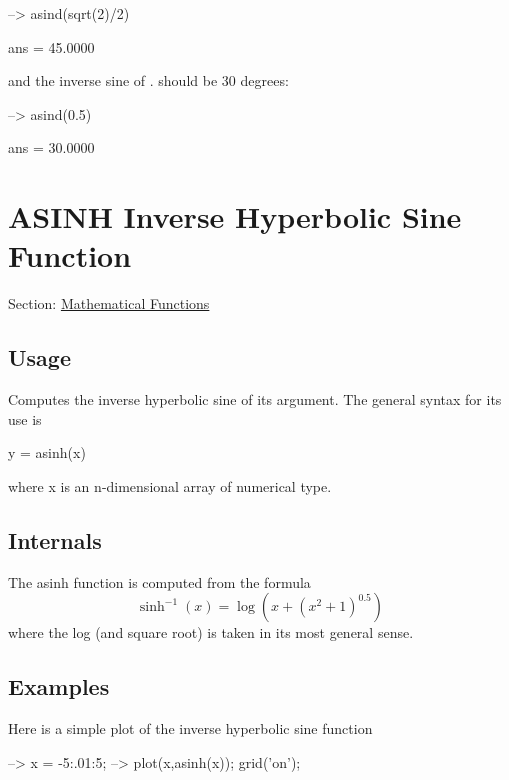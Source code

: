 \begin{DoxyVerbInclude}
--> asind(sqrt(2)/2)

ans = 
   45.0000 
\end{DoxyVerbInclude}


and the inverse sine of {.} should be 30 degrees\-:


\begin{DoxyVerbInclude}
--> asind(0.5)

ans = 
   30.0000 
\end{DoxyVerbInclude}
 \hypertarget{mathfunctions_asinh}{}\section{A\-S\-I\-N\-H Inverse Hyperbolic Sine Function}\label{mathfunctions_asinh}
Section\-: \hyperlink{sec_mathfunctions}{Mathematical Functions} \hypertarget{vtkwidgets_vtkxyplotwidget_Usage}{}\subsection{Usage}\label{vtkwidgets_vtkxyplotwidget_Usage}
Computes the inverse hyperbolic sine of its argument. The general syntax for its use is \begin{DoxyVerb}  y = asinh(x)
\end{DoxyVerb}
 where {\ttfamily x} is an {\ttfamily n}-\/dimensional array of numerical type. \hypertarget{transforms_svd_Function}{}\subsection{Internals}\label{transforms_svd_Function}
The {\ttfamily asinh} function is computed from the formula \[ \sinh^{-1}(x) = \log\left(x + (x^2 + 1)^0.5\right) \] where the {\ttfamily log} (and square root) is taken in its most general sense. \hypertarget{variables_matrix_Examples}{}\subsection{Examples}\label{variables_matrix_Examples}
Here is a simple plot of the inverse hyperbolic sine function


\begin{DoxyVerbInclude}
--> x = -5:.01:5;
--> plot(x,asinh(x)); grid('on');
\end{DoxyVerbInclude}


